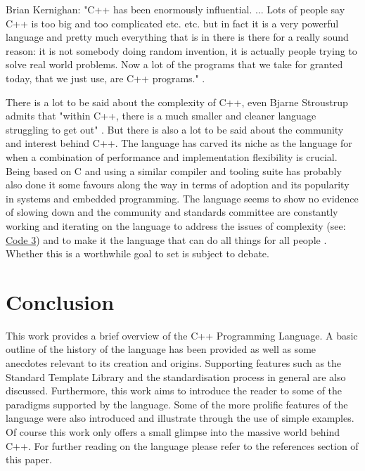 \documentclass[conference, a4paper]{IEEEtran}
\begin{document}
Brian Kernighan:
"C++ has been enormously influential. ... Lots of people say C++ is too big and too complicated etc. etc. but in fact it is a very powerful language and pretty much everything that is in there is there for a really sound reason: it is not somebody doing random invention, it is actually people trying to solve real world problems. Now a lot of the programs that we take for granted today, that we just use, are C++ programs." \cite{bkcomputerphile}.

There is a lot to be said about the complexity of C++, even Bjarne Stroustrup admits that "within C++, there is a much smaller and cleaner language struggling to get out" \cite{cppquotes}. But there is also a lot to be said about the community and interest behind C++. The language has carved its niche as the language for when a combination of performance and implementation flexibility is crucial. Being based on C and using a similar compiler and tooling suite has probably also done it some favours along the way in terms of adoption and its popularity in systems and embedded programming. The language seems to show no evidence of slowing down and the community and standards committee are constantly working and iterating on the language to address the issues of complexity (see: \hyperref[listing:3]{Code 3}) and to make it the language that can do all things for all people . Whether this is a worthwhile goal to set is subject to debate.

\section{Conclusion}

This work provides a brief overview of the C++ Programming Language. A basic outline of the history of the language has been provided as well as some anecdotes relevant to its creation and origins. Supporting features such as the Standard Template Library and the standardisation process in general are also discussed. Furthermore, this work aims to introduce the reader to some of the paradigms supported by the language. Some of the more prolific features of the language were also introduced and illustrate through the use of simple examples. Of course this work only offers a small glimpse into the massive world behind C++. For further reading on the language please refer to the references section of this paper.




\phantom{\cite{*}}

\end{document}
